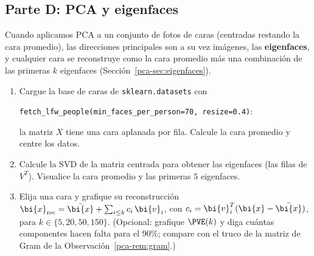 \subsection*{Parte D: PCA y eigenfaces}

Cuando aplicamos PCA a un conjunto de fotos de caras (centradas restando la
cara promedio), las direcciones principales son a su vez imágenes, las
\textbf{eigenfaces}, y
cualquier cara se reconstruye como la cara promedio más una combinación de
las primeras $k$ eigenfaces (Sección~\ref{pca-sec:eigenfaces}).

\begin{enumerate}[leftmargin=*,label=\textbf{TP.\arabic*},ref=TP.\arabic*,itemsep=6pt,resume]

\item Cargue la base de caras de \texttt{sklearn.datasets} con
\begin{center}
\texttt{fetch\_lfw\_people(min\_faces\_per\_person=70, resize=0.4)}:
\end{center}
la matriz $X$ tiene una cara aplanada por fila. Calcule la cara promedio y
centre los datos.

\item Calcule la SVD de la matriz centrada para obtener las eigenfaces (las
filas de $V^T$). Visualice la cara promedio y las primeras $5$
eigenfaces.

\item Elija una cara y grafique su reconstrucción
$\bi{x}_{\text{rec}}=\bar{\bi{x}}+\sum_{i\le k}c_i\,\bi{v}_i$, con $c_i=\bi{v}_i^T(\bi{x}-\bar{\bi{x}})$,
para $k\in\{5,20,50,150\}$. (Opcional: grafique $\PVE(k)$ y diga cuántas
componentes hacen falta para el $90\%$; compare con el truco de la matriz de
Gram de la Observación~\ref{pca-rem:gram}.)

\end{enumerate}

\medskip
{}

